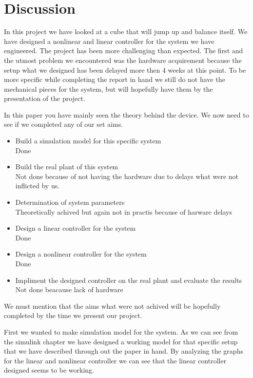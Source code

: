 \section{Discussion}

In this project we have looked at a cube that will jump up and balance itself. 
We have designed a nonlinear and linear controller for the system we have engineered.
The project has been more challenging than expected.
The first and the utmost problem we encountered was the hardware acquirement because the setup what we designed has been delayed more then 4 weeks at this point.
To be more specific while completing the report in hand we still do not have the mechanical pieces for the system, but will hopefully have them by the presentation of the project.

In this paper you have mainly seen the theory behind the device.
We now need to see if we completed any of our set aims.

\begin{itemize}
 \item Build a simulation model for this specific system
 \\Done
 \item Build the real plant of this system
 \\Not done because of not having the hardware due to delays what were not inflicted by us.
 \item Determination of system parameters
 \\Theoretically achived but again not in practis because of harware delays
 \item Design a linear controller for the system
 \\Done
 \item Design a nonlinear controller for the system
 \\Done
 \item Impliment the designed controller on the real plant and evaluate the results
 \\Not done beacause lack of hardware
\end{itemize}

We must mention that the aims what were not achived will be hopefully completed by the time we present our project.

First we wanted to make simulation model for the system.
As we can see from the simulink chapter we have designed a working model for that specific setup that we have described through out the paper in hand.
By analyzing the graphs for the linear and nonlinear controller we can see that the linear controller designed seems to be working.

